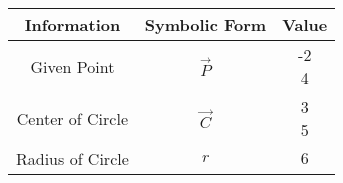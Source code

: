 \begin{tabular}[12pt]{|c|c|c|}
    \hline
	\textbf{Information} & \textbf{Symbolic Form} & \textbf{Value}\\ 
    \hline
	Given Point & $\vec{P}$ & \myvec{-2 \\ 4} \\
    \hline 
	Center of Circle & $\vec{C}$ & \myvec{3 \\ 5} \\
    \hline
	Radius of Circle & $r$ & $6$ \\
    \hline   
    \end{tabular}
